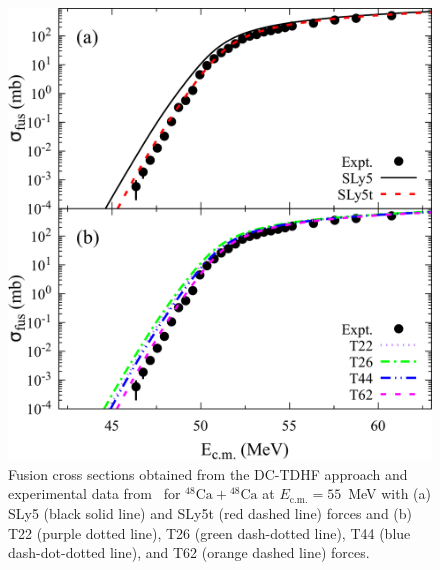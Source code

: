 \begin{figure}
\includegraphics[width=\textwidth]{../Figures/TensorXsec/TXXCrossSections_Ca48Ca48.pdf}
\caption{Fusion cross sections obtained from the DC-TDHF approach and experimental data from~\protect\citep{stefanini2009} for $^{48}\mathrm{Ca}+\mathrm{^{48}Ca}$ at $E_{\mathrm{c.m.}}=55$~MeV with (a) SLy5 (black solid line) and SLy5t (red dashed line) forces and (b) T22 (purple dotted line), T26 (green dash-dotted line), T44 (blue dash-dot-dotted line), and T62 (orange dashed line) forces.
	\label{Fig:CaTXXxsec}}
\end{figure}

